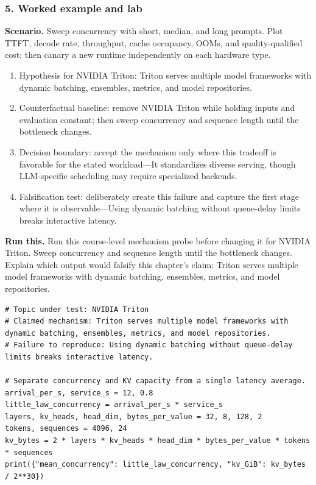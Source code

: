 \subsubsection*{5. Worked example and lab}
\textbf{Scenario.} Sweep concurrency with short, median, and long prompts. Plot TTFT, decode rate, throughput, cache occupancy, OOMs, and quality-qualified cost; then canary a new runtime independently on each hardware type.
\begin{enumerate}
\item Hypothesis for NVIDIA Triton: Triton serves multiple model frameworks with dynamic batching, ensembles, metrics, and model repositories.
\item Counterfactual baseline: remove NVIDIA Triton while holding inputs and evaluation constant; then sweep concurrency and sequence length until the bottleneck changes.
\item Decision boundary: accept the mechanism only where this tradeoff is favorable for the stated workload—It standardizes diverse serving, though LLM-specific scheduling may require specialized backends.
\item Falsification test: deliberately create this failure and capture the first stage where it is observable—Using dynamic batching without queue-delay limits breaks interactive latency.
\end{enumerate}
\textbf{Run this.} Run this course-level mechanism probe before changing it for NVIDIA Triton. Sweep concurrency and sequence length until the bottleneck changes. Explain which output would falsify this chapter's claim: Triton serves multiple model frameworks with dynamic batching, ensembles, metrics, and model repositories.
\begin{Verbatim}[fontsize=\scriptsize]
# Topic under test: NVIDIA Triton
# Claimed mechanism: Triton serves multiple model frameworks with dynamic batching, ensembles, metrics, and model repositories.
# Failure to reproduce: Using dynamic batching without queue-delay limits breaks interactive latency.

# Separate concurrency and KV capacity from a single latency average.
arrival_per_s, service_s = 12, 0.8
little_law_concurrency = arrival_per_s * service_s
layers, kv_heads, head_dim, bytes_per_value = 32, 8, 128, 2
tokens, sequences = 4096, 24
kv_bytes = 2 * layers * kv_heads * head_dim * bytes_per_value * tokens * sequences
print({"mean_concurrency": little_law_concurrency, "kv_GiB": kv_bytes / 2**30})
\end{Verbatim}
